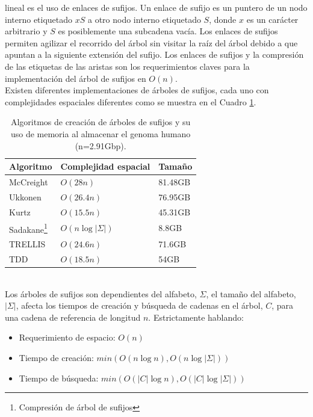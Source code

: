\documentclass[12pt,a4paper]{article}
\begin{document}
lineal es el uso de enlaces de sufijos. Un enlace de sufijo es un puntero de un 
nodo interno etiquetado $xS$ a otro nodo interno etiquetado $S$, donde $x$ es un 
carácter arbitrario y $S$ es posiblemente una subcadena vacía. Los enlaces de 
sufijos permiten agilizar el recorrido del árbol sin visitar la raíz del árbol 
debido a que apuntan a la siguiente extensión del sufijo. Los enlaces de sufijos 
y la compresión de las etiquetas de las aristas son los requerimientos claves 
para la implementación del árbol de sufijos en $O(n)$.\\
\indent
Existen diferentes implementaciones de árboles de sufijos, cada uno con 
complejidades espaciales diferentes como se muestra en el Cuadro \ref{tab:stmem}.\\
\begin{table}[h!]  
\begin{small}
\begin{center}
\begin{tabular}{lll}
Algoritmo & Complejidad espacial & Tamaño \\
\hline
McCreight & $O(28n)$ & 81.48GB \\
\hline
Ukkonen & $O(26.4n)$ & 76.95GB \\
\hline
Kurtz & $O(15.5n)$ & 45.31GB \\
\hline
Sadakane\footnote{Compresión de árbol de sufijos} & $O(n\log|\Sigma|)$ & 8.8GB \\
\hline
TRELLIS \cite{Phoophakdee2007} & $O(24.6n)$ & 71.6GB \\
\hline
TDD \cite{Barsky2010} & $O(18.5n)$ & 54GB \\
\end{tabular}
\end{center}
\end{small}
\caption{Algoritmos de creación de árboles de sufijos y su uso de memoria al
almacenar el genoma humano (n=2.91Gbp).}
\label{tab:stmem}
\end{table}
\\ \indent
Los árboles de sufijos son dependientes del alfabeto, $\Sigma$, el tamaño 
del alfabeto, $|\Sigma|$, afecta los tiempos de creación y búsqueda de 
cadenas en el árbol, $C$, para una cadena de referencia de longitud $n$. 
Estrictamente hablando:
    \begin{itemize} 
      \item Requerimiento de espacio: $O(n)$ 
      \item Tiempo de creación: $min (O(n\log n), O(n\log |\Sigma|))$ 
      \item Tiempo de búsqueda: $min (O(|C|\log n), O(|C|\log |\Sigma|))$ 
    \end{itemize}
\end{document}
